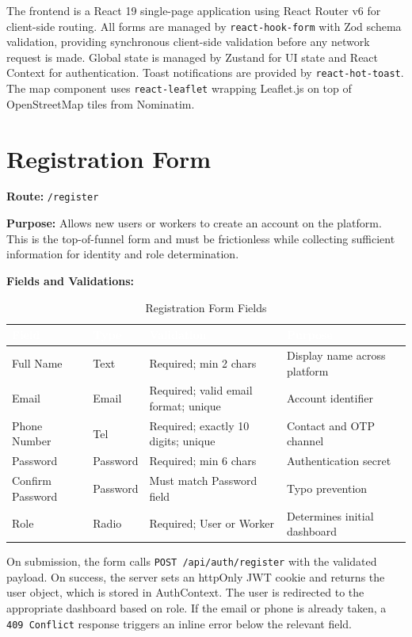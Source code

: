 \documentclass[12pt,a4paper]{report}
\newcommand{\thead}[1]{\cellcolor{tableheader}\textcolor{white}{\textbf{#1}}}
\begin{document}
The frontend is a React 19 single-page application using React Router v6 for client-side routing. All forms are managed by \texttt{react-hook-form} with Zod schema validation, providing synchronous client-side validation before any network request is made. Global state is managed by Zustand for UI state and React Context for authentication. Toast notifications are provided by \texttt{react-hot-toast}. The map component uses \texttt{react-leaflet} wrapping Leaflet.js on top of OpenStreetMap tiles from Nominatim.

\section{Registration Form}

\textbf{Route:} \texttt{/register}

\textbf{Purpose:} Allows new users or workers to create an account on the platform. This is the top-of-funnel form and must be frictionless while collecting sufficient information for identity and role determination.

\textbf{Fields and Validations:}

\begin{table}[h!]
\centering
\caption{Registration Form Fields}
\renewcommand{\arraystretch}{1.3}
\begin{tabular}{|p{3cm}|p{2cm}|p{4cm}|p{4cm}|}
\hline
\thead{Field} & \thead{Type} & \thead{Validation} & \thead{Purpose} \\
\hline
Full Name & Text & Required; min 2 chars & Display name across platform \\
Email & Email & Required; valid email format; unique & Account identifier \\
Phone Number & Tel & Required; exactly 10 digits; unique & Contact and OTP channel \\
Password & Password & Required; min 6 chars & Authentication secret \\
Confirm Password & Password & Must match Password field & Typo prevention \\
Role & Radio & Required; User or Worker & Determines initial dashboard \\
\hline
\end{tabular}
\end{table}

On submission, the form calls \texttt{POST /api/auth/register} with the validated payload. On success, the server sets an httpOnly JWT cookie and returns the user object, which is stored in AuthContext. The user is redirected to the appropriate dashboard based on role. If the email or phone is already taken, a \texttt{409 Conflict} response triggers an inline error below the relevant field.
\end{document}
